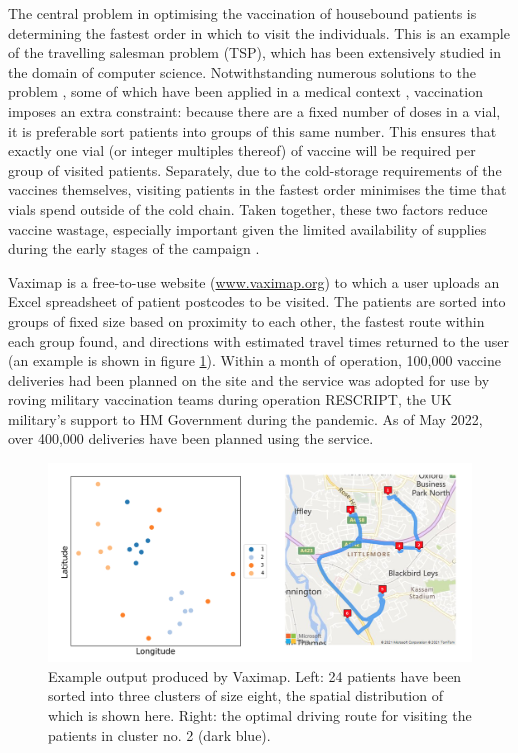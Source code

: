 \documentclass{article}
\def\vm{Vaximap}
\begin{document}
The central problem in optimising the vaccination of housebound patients is determining the fastest order in which to visit the individuals. This is an example of the travelling salesman problem (TSP), which has been extensively studied in the domain of computer science. Notwithstanding numerous solutions to the problem \cite{Laporte1990}, some of which have been applied in a medical context \cite{Shao2012}, vaccination imposes an extra constraint: because there are a fixed number of doses in a vial, it is preferable sort patients into groups of this same number. This ensures that exactly one vial (or integer multiples thereof) of vaccine will be required per group of visited patients. Separately, due to the cold-storage requirements of the vaccines themselves, visiting patients in the fastest order minimises the time that vials spend outside of the cold chain. Taken together, these two factors reduce vaccine wastage, especially important given the limited availability of supplies during the early stages of the campaign \cite{NHSE_AZ}.

Vaximap is a free-to-use website (\url{www.vaximap.org}) to which a user uploads an Excel spreadsheet of patient postcodes to be visited. The patients are sorted into groups of fixed size based on proximity to each other, the fastest route within each group found, and directions with estimated travel times returned to the user (an example is shown in figure \ref{demo}). Within a month of operation, 100,000 vaccine deliveries had been planned on the site and the service was adopted for use by roving military vaccination teams during operation RESCRIPT, the UK military's support to HM Government during the pandemic. As of May 2022, over 400,000 deliveries have been planned using the service.

\begin{figure}[H]
\centering
\includegraphics[width=\textwidth]{demo.png}
\caption{Example output produced by \vm{}. Left: 24 patients have been sorted into three clusters of size eight, the spatial distribution of which is shown here. Right: the optimal driving route for visiting the patients in cluster no. 2 (dark blue).}
\label{demo}
\end{figure}
\end{document}
